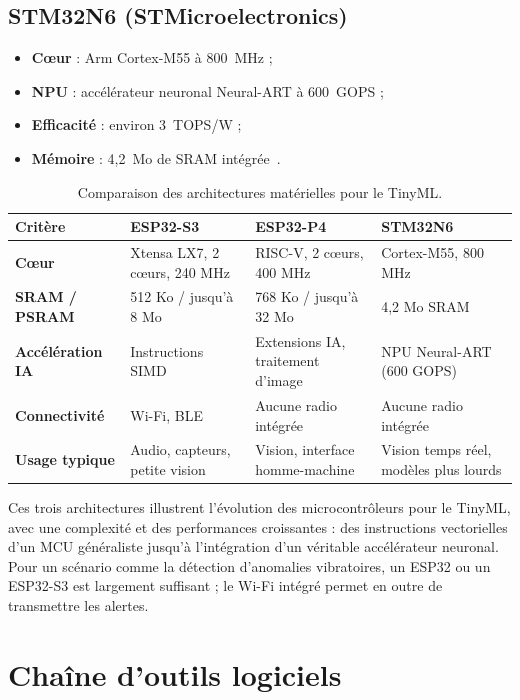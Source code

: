 \subsection{STM32N6 (STMicroelectronics)}
\begin{itemize}
  \item \textbf{Cœur} : Arm Cortex-M55 à 800~MHz ;
  \item \textbf{NPU} : accélérateur neuronal Neural-ART à 600~GOPS ;
  \item \textbf{Efficacité} : environ 3~TOPS/W ;
  \item \textbf{Mémoire} : 4,2~Mo de SRAM intégrée~\cite{st-stm32n6}.
\end{itemize}

\begin{table}[H]
\centering
\small
\begin{tabularx}{\linewidth}{>{\bfseries}l X X X}
\toprule
Critère & ESP32-S3 & ESP32-P4 & STM32N6 \\
\midrule
Cœur           & Xtensa LX7, 2 cœurs, 240 MHz & RISC-V, 2 cœurs, 400 MHz & Cortex-M55, 800 MHz \\
SRAM / PSRAM   & 512 Ko / jusqu'à 8 Mo & 768 Ko / jusqu'à 32 Mo & 4,2 Mo SRAM \\
Accélération IA & Instructions SIMD & Extensions IA, traitement d'image & NPU Neural-ART (600 GOPS) \\
Connectivité   & Wi-Fi, BLE & Aucune radio intégrée & Aucune radio intégrée \\
Usage typique  & Audio, capteurs, petite vision & Vision, interface homme-machine & Vision temps réel, modèles plus lourds \\
\bottomrule
\end{tabularx}
\caption{Comparaison des architectures matérielles pour le TinyML.}
\label{tab:materiel}
\end{table}

Ces trois architectures illustrent l'évolution des microcontrôleurs pour le
TinyML, avec une complexité et des performances croissantes : des instructions
vectorielles d'un MCU généraliste jusqu'à l'intégration d'un véritable
accélérateur neuronal. Pour un scénario comme la détection d'anomalies
vibratoires, un ESP32 ou un ESP32-S3 est largement suffisant ; le Wi-Fi
intégré permet en outre de transmettre les alertes.

\section{Chaîne d'outils logiciels}

